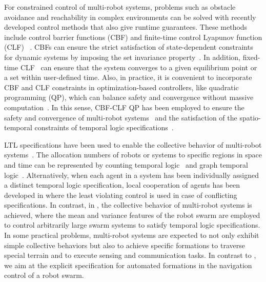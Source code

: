 \documentclass[letterpaper, 10 pt, conference]{ieeeconf}
\begin{document}
For constrained control of multi-robot systems, problems such as obstacle avoidance and reachability in complex environments can be solved with recently developed control methods that also give runtime guarantees. These methods include control barrier functions (CBF) \cite{ames2017} and finite-time control Lyapunov function (CLF) ~\cite{FxT2022}. CBFs can ensure the strict satisfaction of state-dependent constraints for dynamic systems by imposing the set invariance property~\cite{ames2017}. In addition, fixed-time CLF~\cite{FxT2022}  can ensure that the system converges to a given equilibrium point or a set within user-defined time. Also, in practice, it is convenient to incorporate CBF and CLF constraints in optimization-based controllers, like quadratic programming (QP), which can balance safety and convergence without massive computation~\cite{Ames2017tac, FxT2022}. 
In this sense, CBF-CLF QP has been employed to ensure the safety and convergence of multi-robot systems~\cite{wang2017safety, tan2021distributed} and the satisfaction of the spatio-temporal constraints of temporal logic specifications~\cite{lindemann2018control, Sri2021}.
 

LTL specifications have been used to enable the collective behavior of multi-robot systems~\cite{calin2013ijrr, sun2022multi,calin2007tro}.  The allocation numbers of robots or systems to specific regions in space and time can be represented by counting temporal logic~\cite{tro2020CTL} and graph temporal logic~\cite{djeumou2020rss}. Alternatively, when each agent in a system has been individually assigned a distinct temporal logic specification, local cooperation of agents has been developed in \cite{lindemann2019control} where the least violating control is used in case of conflicting specifications. In contrast, in \cite{calin2007tro}, the collective behavior of multi-robot systems is achieved, where the mean and variance features of the robot swarm are employed to control arbitrarily large swarm systems to satisfy temporal logic specifications. In some practical problems, multi-robot systems are expected to not only exhibit simple collective behaviors but also to achieve specific formations to traverse special terrain and to execute sensing and communication tasks. In contrast to \cite{calin2007tro}, we aim at the explicit specification for automated formations in the navigation control of a robot swarm. 
\end{document}
